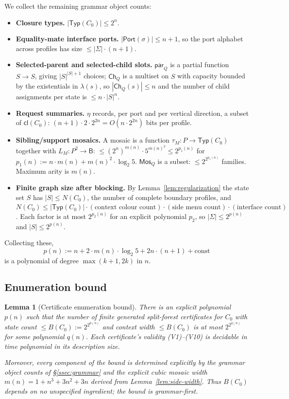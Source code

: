 \documentclass[11pt]{article}
\newtheorem{lemma}[theorem]{Lemma}
\newcommand{\Base}{\mathsf{B}}
\newcommand{\Cl}{\mathsf{cl}}
\newcommand{\Typ}{\mathsf{Typ}}
\newcommand{\Mos}{\mathsf{Mos}}
\newcommand{\parr}{\mathsf{par}}
\newcommand{\Port}{\mathsf{Port}}
\begin{document}
We collect the remaining grammar object counts:
\begin{itemize}[leftmargin=2em]
  \item \textbf{Closure types.}  $|\Typ(C_0)|\le 2^n$.
  \item \textbf{Equality-mate interface ports.}
    $|\Port(\sigma)|\le n+1$, so the port alphabet across profiles
    has size $\le|\Sigma|\cdot(n+1)$.
  \item \textbf{Selected-parent and selected-child slots.}  $\parr_Q$
    is a partial function $S\to S$, giving $|S|^{|S|+1}$ choices;
    $\mathsf{Ch}_Q$ is a multiset on $S$ with capacity bounded by the
    existentials in $\lambda(s)$, so $|\mathsf{Ch}_Q(s)|\le n$ and
    the number of child assignments per state is $\le n\cdot|S|^n$.
  \item \textbf{Request summaries.}  $\eta$ records, per port and
    per vertical direction, a subset of $\Cl(C_0)$:
    $(n+1)\cdot 2\cdot 2^{2n}=O(n\cdot 2^{2n})$ bits per profile.
  \item \textbf{Sibling/support mosaics.}  A mosaic is a function
    $\tau_M:P\to\Typ(C_0)$ together with $L_M:P^2\to\Base$:
    $\le(2^n)^{m(n)}\cdot 5^{m(n)^2}\le 2^{p_1(n)}$ for
    $p_1(n):=n\cdot m(n)+m(n)^2\cdot\log_2 5$.  $\Mos_Q$ is a subset:
    $\le 2^{2^{p_1(n)}}$ families.  Maximum arity is $m(n)$.
  \item \textbf{Finite graph size after blocking.}  By
    Lemma~\ref{lem:regularization} the state set $S$ has
    $|S|\le N(C_0)$, the number of complete boundary profiles, and
    $N(C_0)\le|\Typ(C_0)|\cdot(\text{context colour count})\cdot
    (\text{side menu count})\cdot(\text{interface count})$.  Each
    factor is at most $2^{p_2(n)}$ for an explicit polynomial $p_2$,
    so $|\Sigma|\le 2^{p(n)}$ and $|S|\le 2^{p(n)}$.
\end{itemize}
Collecting these,
\[
  p(n):=n+2\cdot m(n)\cdot\log_2 5+2n\cdot(n+1)+\text{const}
\]
is a polynomial of degree $\max(k+1,2k)$ in $n$.

\subsection{Enumeration bound}
\label{ssec:enumeration}

\begin{lemma}[Certificate enumeration bound]\label{lem:enumeration}
There is an explicit polynomial $p(n)$ such that the number of
finite generated split-forest certificates for $C_0$ with state count
$\le B(C_0):=2^{2^{p(n)}}$ and context width $\le B(C_0)$ is at
most $2^{2^{q(n)}}$ for some polynomial $q(n)$.  Each certificate's
validity (V1)--(V10) is decidable in time polynomial in its
description size.

Moreover, every component of the bound is determined explicitly by
the grammar object counts of \S\ref{ssec:grammar} and the explicit
cubic mosaic width $m(n)=1+n^3+3n^2+3n$ derived from
Lemma~\ref{lem:side-width}.  Thus $B(C_0)$ depends on no
unspecified ingredient; the bound is grammar-first.
\end{lemma}
\end{document}
